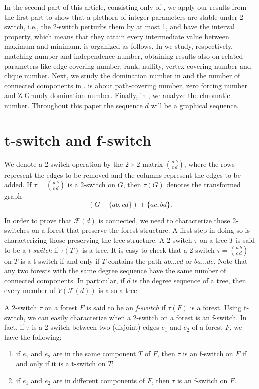 \documentclass{BICA}
\begin{document}
In the second part of this article, consisting only of  , we apply our results from the first part to show that a plethora of integer parameters are stable under 2-switch, i.e., the 2-switch perturbs them by at most 1, and have the interval property, which means that they attain every intermediate value between maximum and minimum.  is organized as follows. In  we study, respectively, matching number and independence number, obtaining results also on related parameters like edge-covering number, rank, nullity, vertex-covering number and clique number. Next, we study the domination number in  and the number of connected components in .  is about path-covering number, zero forcing number and Z-Grundy domination number. Finally, in , we analyze the chromatic number. Throughout this paper the sequence $d$ will be a graphical sequence.

\section{t-switch and f-switch}\label{sectiontswitch}

We denote a 2-switch operation by the $2\times 2$ matrix ${{a \ b}\choose{c \ d}}$, where the rows represent the edges to be removed and the columns represent the edges to be added. If $\tau= {{a \ b}\choose{c \ d}}$ is a 2-switch on $G$, then $\tau(G)$ denotes the transformed graph
\[ (G-\{ab,cd\})+\{ac,bd\}. \]

In order to prove that $\mathcal{F}(d)$ is connected, we need to characterize those 2-switches on a forest that preserve the forest structure. A first step in doing so is characterizing those preserving the tree structure. A 2-switch $\tau$ on a tree $T$ is said to be a \emph{t-switch} if $\tau(T)$ is a tree. It is easy to check that a 2-switch $\tau={{a \ b}\choose{c \ d}}$ on $T$ is a t-switch if and only if $T$ contains the path $ab\ldots cd$ or $ba\ldots dc$. Note that any two forests with the same degree sequence have the same number of connected components. In particular, if $d$ is the degree sequence of a tree, then every member of $V(\mathcal{F}(d))$ is also a tree.

A 2-switch $\tau$ on a forest $F$ is said to be an \emph{f-switch} if $\tau(F)$ is a forest. Using t-switch, we can easily characterize when a 2-switch on a forest is an f-switch. In fact, if $\tau$ is a 2-switch between two (disjoint) edges $e_{1}$ and $e_{2}$ of a forest $F$, we have the following:
\begin{enumerate}
	\item if $e_{1}$ and $e_{2}$ are in the same component $T$ of $F$, then $\tau$ is an f-switch on $F$ if and only if it is a t-switch on $T$;

	\item if $e_{1}$ and $e_{2}$ are in different components of $F$, then $\tau$ is an f-switch on $F$.
\end{enumerate}
\end{document}
